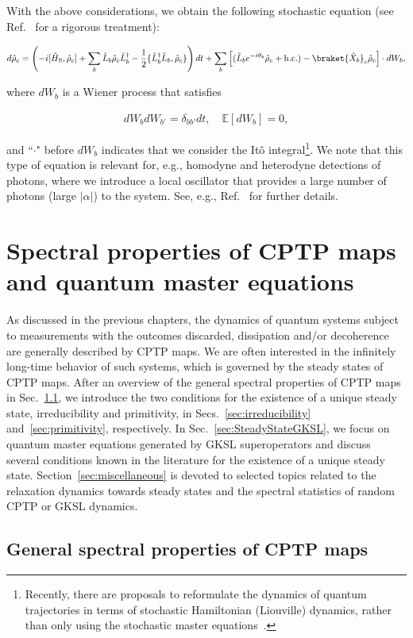 \documentclass[preprint,pteplogo]{ptephy_v2}%
\numberwithin{equation}{section}
\theoremstyle{definition}
\newcommand{\mr}[1]{\mathrm{#1}}
\newcommand{\mbb}[1]{\mathbb{#1}}
\newcommand{\lrs}[1]{\left( #1 \right)}
\newcommand{\lrl}[1]{\left[ #1 \right]}
\newcommand{\aln}[1]{
\begin{align}
#1
\end{align}
}
\begin{document}
With the above considerations, we obtain the following stochastic equation (see Ref.~\cite{pellegrini2009diffusion} for a rigorous treatment):
\aln{\label{qdfeq}
d\hat{\rho}_c=\lrs{-i[\hat{H}_\mr{S},\hat{\rho}_c]+\sum_b\hat{L}_b\hat{\rho}_c\hat{L}_b^\dag-\frac{1}{2}\{\hat{L}_b^\dag\hat{L}_b,\hat{\rho}_c\}}dt
+\sum_b\lrl{(\hat{L}_b e^{-i\theta_b}\hat{\rho}_c+\mr{h.c.})-\braket{\hat{X}_b}_c\hat{\rho}_c}\cdot dW_b,
}
where $dW_b$ is a Wiener process that satisfies
\aln{
dW_b dW_{b'}=\delta_{bb'}dt, \quad\mbb{E}[dW_b]=0,
}
and ``$\cdot$" before $dW_b$ indicates that we consider the It\^o integral\footnote{Recently, there are proposals to reformulate the dynamics of quantum trajectories in terms of stochastic Hamiltonian (Liouville) dynamics, rather than only using the stochastic master equations~\cite{l18s-9vmh,villanueva2025hamiltonian}.}.
We note that this type of equation is relevant for, e.g., homodyne and heterodyne detections of photons, where we introduce a local oscillator that provides a large number of photons (large $|\alpha|$) to the system.
See, e.g., Ref.~\cite{wiseman2009quantum} for further details.


\section{Spectral properties of CPTP maps and quantum master equations}\label{sec:CPTPspectra}

As discussed in the previous chapters, the dynamics of quantum systems subject to measurements with the outcomes discarded, dissipation and/or decoherence are generally described by CPTP maps.
We are often interested in the infinitely long-time behavior of such systems, which is governed by the steady states of CPTP maps. 
After an overview of the general spectral properties of CPTP maps in Sec.~\ref{sec:GeneralSpecCPTP}, we introduce the two conditions for the existence of a unique steady state, irreducibility and primitivity, in Secs.~\ref{sec:irreducibility} and~\ref{sec:primitivity}, respectively.
In Sec.~\ref{sec:SteadyStateGKSL}, we focus on quantum master equations generated by GKSL superoperators and discuss several conditions known in the literature for the existence of a unique steady state.
Section~\ref{sec:miscellaneous} is devoted to selected topics related to the relaxation dynamics towards steady states and the spectral statistics of random CPTP or GKSL dynamics.


\subsection{General spectral properties of CPTP maps}
\label{sec:GeneralSpecCPTP}
\end{document}
